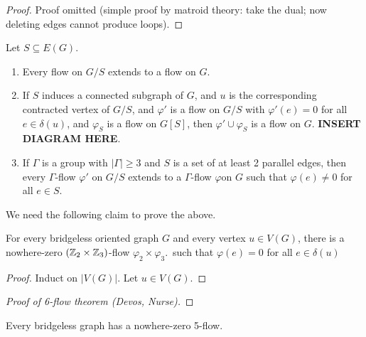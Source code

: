 \documentclass[main.tex]{subfiles}
\begin{document}
\begin{proof}
  Proof omitted (simple proof by matroid theory: take the dual; now deleting
  edges cannot produce loops).
\end{proof}
\begin{proposition}
  Let $S\subseteq E(G)$.
  \begin{enumerate}[label=(\arabic*)]
    \item Every flow on $G/S$ extends to a flow on $G$.

    \item If $S$ induces a connected subgraph of $G$, and $u$ is the
      corresponding contracted vertex of $G/S$, and $\varphi'$ is a flow on
      $G/S$ with $\varphi'(e) = 0$ for all $e\in\delta(u)$, and $\varphi_S$ is a
      flow on $G[S]$, then $\varphi'\cup\varphi_S$ is a flow on $G$.
      \textbf{INSERT DIAGRAM HERE}.

    \item If $\Gamma$ is a group with $|\Gamma|\geq 3$ and $S$ is a set of
      at least 2 parallel edges, then every $\Gamma$-flow $\varphi'$ on $G/S$
      extends to a $\Gamma$-flow $\varphi$on $G$ such that $\varphi(e)\neq 0$
      for all $e\in S$.
  \end{enumerate}
\end{proposition}
We need the following claim to prove the above.
\begin{claim}
  For every bridgeless oriented graph $G$ and every vertex $u\in V(G)$,
  there is a nowhere-zero $(\mathbb Z_2\times\mathbb Z_3)$-flow $\varphi_2\times\varphi_3$.\
  such that $\varphi(e) = 0$ for all $e\in\delta(u)$
\end{claim}
\begin{proof}
  Induct on $|V(G)|$.
  Let $u\in V(G)$.
\end{proof}
\begin{proof}[Proof of 6-flow theorem (Devos, Nurse)]
  
\end{proof}
\begin{conjecture}
  Every bridgeless graph has a nowhere-zero 5-flow.
\end{conjecture}
\end{document}

